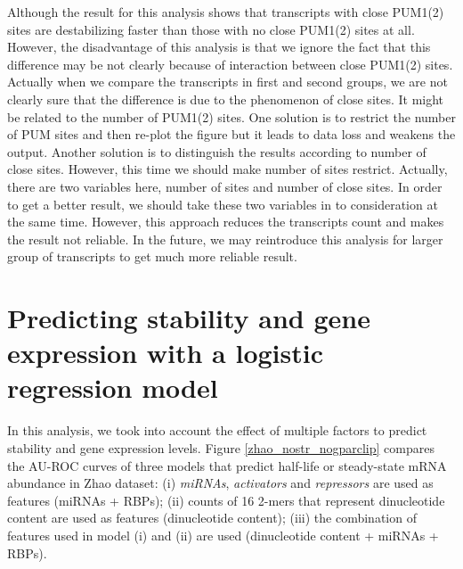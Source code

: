 Although the result for this analysis shows that transcripts with close PUM1(2) sites are destabilizing faster than those with no close PUM1(2) sites at all. However, the disadvantage of this analysis is that we ignore the fact that this difference may be not clearly because of interaction between close PUM1(2) sites. Actually when we compare the transcripts in first and second groups, we are not clearly sure that the difference is due to the phenomenon of close sites. It might be related to the number of PUM1(2) sites. One solution is to restrict the number of PUM sites and then re-plot the figure but it leads to data loss and weakens the output. Another solution is to distinguish the results according to number of close sites. However, this time we should make number of sites restrict. Actually, there are two variables here, number of sites and number of close sites. In order to get a better result, we should take these two variables in to consideration at the same time. However, this approach reduces the transcripts count and makes the result not reliable. In the future, we may reintroduce this analysis for larger group of transcripts to get much more reliable result.

\clearpage
\section{Predicting stability and gene expression with a logistic regression model}

In this analysis, we took into account the effect of multiple factors to predict stability and gene expression levels. Figure \ref{zhao_nostr_nogparclip} compares the AU-ROC curves of three models that predict half-life or steady-state mRNA abundance in Zhao dataset: (i) \textit{miRNAs}, \textit{activators} and \textit{repressors} are used as features (miRNAs + RBPs); (ii) counts of 16 2-mers that represent dinucleotide content are used as features (dinucleotide content); (iii) the combination of features used in model (i) and (ii) are used (dinucleotide content + miRNAs + RBPs). 

